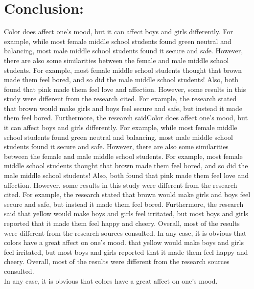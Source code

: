 \documentclass[12pt, letterpaper]{article}
\begin{document}
\section{Conclusion:}
Color does affect one’s mood, but it can affect boys and girls differently. For example, while most female middle school students found green neutral and balancing, most male middle school students found it secure and safe. However, there are also some similarities between the female and male middle school students. For example, most female middle school students thought that brown made them feel bored, and so did the male middle school students! Also, both found that pink made them feel love and affection. However, some results in this study were different from the research cited. For example, the research stated that brown would make girls and boys feel secure and safe, but instead it made them feel bored. Furthermore, the research saidColor does affect one’s mood, but it can affect boys and girls differently. For example, while most female middle school students found green neutral and balancing, most male middle school students found it secure and safe. However, there are also some similarities between the female and male middle school students. For example, most female middle school students thought that brown made them feel bored, and so did the male middle school students! Also, both found that pink made them feel love and affection. However, some results in this study were different from the research cited. For example, the research stated that brown would make girls and boys feel secure and safe, but instead it made them feel bored. Furthermore, the research said that yellow would make boys and girls feel irritated, but most boys and girls reported that it made them feel happy and cheery. Overall, most of the results were different from the research sources consulted. 
In any case, it is obvious that colors have a great affect on one’s mood.
 that yellow would make boys and girls feel irritated, but most boys and girls reported that it made them feel happy and cheery. Overall, most of the results were different from the research sources consulted.\\ 
In any case, it is obvious that colors have a great affect on one’s mood.
\\
\end{document}

